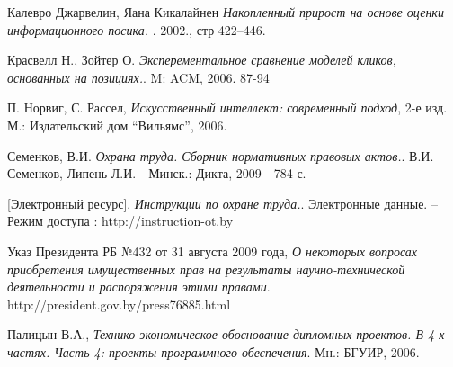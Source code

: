 \begin{thebibliography}{99}
  Калевро Джарвелин, Яана Кикалайнен
  \emph{Накопленный прирост на основе оценки информационного посика. }.
  2002., стр 422–446.

  Красвелл Н., Зойтер О.
  \emph{Эксперементальное сравнение моделей кликов, основанных на позициях.}.
  M: ACM, 2006. 87-94

  П. Норвиг, С. Рассел,
  \emph{Искусственный интеллект: современный подход}, 2-е изд.
  М.: Издательский дом ``Вильямс'',
  2006.

  Семенков, В.И.
  \emph{Охрана труда. Сборник нормативных правовых актов.}.
  В.И. Семенков, Липень Л.И. - Минск.: Дикта, 2009 - 784 с.

  [Электронный ресурс].
  \emph{Инструкции по охране труда.}.
  Электронные данные.  – Режим доступа : http://instruction-ot.by

  Указ Президента РБ №432 от 31 августа 2009 года,
  \emph{О некоторых вопросах приобретения имущественных прав на результаты научно-технической деятельности и распоряжения этими правами}.
  http://president.gov.by/press76885.html

  Палицын В.А.,
  \emph{Технико-экономическое обоснование дипломных проектов. В 4-х частях. Часть 4: проекты программного обеспечения}.
  Мн.: БГУИР,
  2006.

\end{thebibliography}

\newpage